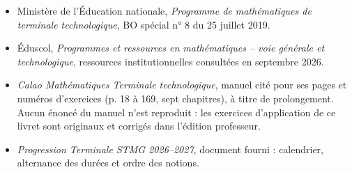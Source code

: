 \begin{itemize}
\item Ministère de l'Éducation nationale, \emph{Programme de mathématiques de terminale technologique}, BO spécial n° 8 du 25 juillet 2019.
\item Éduscol, \emph{Programmes et ressources en mathématiques -- voie générale et technologique}, ressources institutionnelles consultées en septembre 2026.
\item \emph{Calao Mathématiques Terminale technologique}, manuel cité pour ses pages et numéros d'exercices (p. 18 à 169, sept chapitres), à titre de prolongement. Aucun énoncé du manuel n'est reproduit : les exercices d'application de ce livret sont originaux et corrigés dans l'édition professeur.
\item \emph{Progression Terminale STMG 2026--2027}, document fourni : calendrier, alternance des durées et ordre des notions.
\end{itemize}
